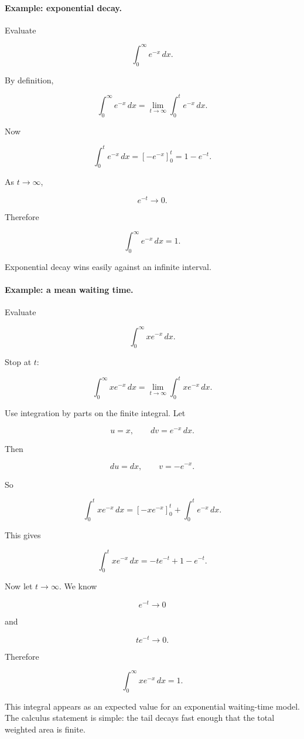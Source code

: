 \paragraph{Example: exponential decay.}
Evaluate

\[
\int_0^\infty e^{-x}\,dx.
\]

By definition,

\[
\int_0^\infty e^{-x}\,dx
=
\lim_{t\to\infty}\int_0^t e^{-x}\,dx.
\]

Now

\[
\int_0^t e^{-x}\,dx
=
\left[-e^{-x}\right]_0^t
=
1-e^{-t}.
\]

As \(t\to\infty\),

\[
e^{-t}\to0.
\]

Therefore

\[
\boxed{
\int_0^\infty e^{-x}\,dx=1.
}
\]

Exponential decay wins easily against an infinite interval.

\paragraph{Example: a mean waiting time.}
Evaluate

\[
\int_0^\infty x e^{-x}\,dx.
\]

Stop at \(t\):

\[
\int_0^\infty x e^{-x}\,dx
=
\lim_{t\to\infty}\int_0^t x e^{-x}\,dx.
\]

Use integration by parts on the finite integral.  Let

\[
u=x,
\qquad
dv=e^{-x}\,dx.
\]

Then

\[
du=dx,
\qquad
v=-e^{-x}.
\]

So

\[
\int_0^t x e^{-x}\,dx
=
\left[-xe^{-x}\right]_0^t+\int_0^t e^{-x}\,dx.
\]

This gives

\[
\int_0^t x e^{-x}\,dx
=
-te^{-t}+1-e^{-t}.
\]

Now let \(t\to\infty\).  We know

\[
e^{-t}\to0
\]

and

\[
te^{-t}\to0.
\]

Therefore

\[
\boxed{
\int_0^\infty x e^{-x}\,dx=1.
}
\]

This integral appears as an expected value for an exponential waiting-time model.  The
calculus statement is simple: the tail decays fast enough that the total weighted area is
finite.


